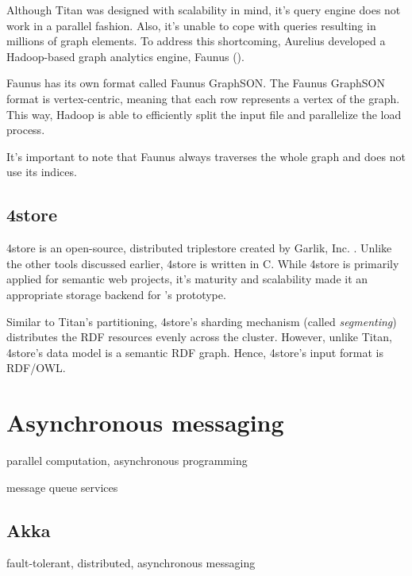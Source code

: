 Although Titan was designed with scalability in mind, it's query engine does not work in a parallel fashion. Also, it's unable to cope with queries resulting in millions of graph elements. To address this shortcoming, Aurelius developed a Hadoop-based graph analytics engine, Faunus ().

Faunus has its own format called Faunus GraphSON. The Faunus GraphSON format is vertex-centric, meaning that each row represents a vertex of the graph. This way, Hadoop is able to efficiently split the input file and parallelize the load process.


It's important to note that Faunus always traverses the whole graph and does not use its indices.

\subsection{4store}

4store is an open-source, distributed triplestore created by Garlik, Inc. \cite{4store}. Unlike the other tools discussed earlier, 4store is written in C. While 4store is primarily applied for semantic web projects, it's maturity and scalability made it an appropriate storage backend for \iqd's prototype.

Similar to Titan's partitioning, 4store's sharding mechanism (called \emph{segmenting}) distributes the RDF resources evenly across the cluster. However, unlike Titan, 4store's data model is a semantic RDF graph. Hence, 4store's input format is RDF/OWL.  


\section{Asynchronous messaging}

parallel computation, asynchronous programming 

message queue services

\subsection{Akka}

fault-tolerant, distributed, asynchronous messaging


